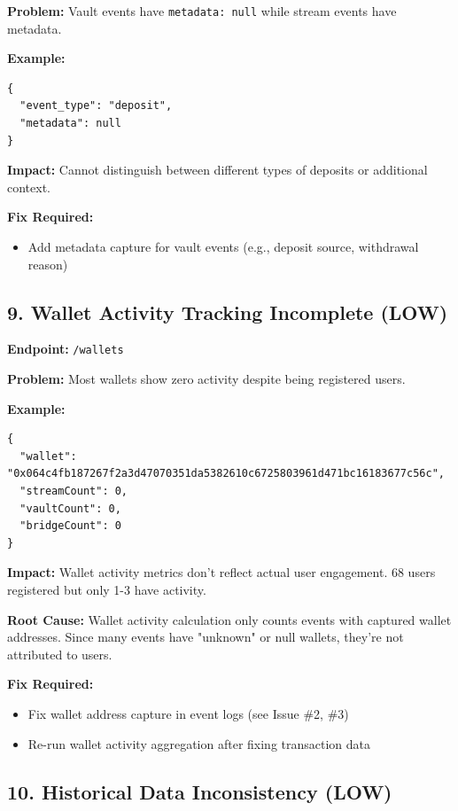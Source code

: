 \documentclass[11pt,a4paper]{article}
\begin{document}
\textbf{Problem:} Vault events have \texttt{metadata: null} while stream events have metadata.

\textbf{Example:}
\begin{lstlisting}
{
  "event_type": "deposit",
  "metadata": null
}
\end{lstlisting}

\textbf{Impact:} Cannot distinguish between different types of deposits or additional context.

\textbf{Fix Required:}
\begin{itemize}
    \item Add metadata capture for vault events (e.g., deposit source, withdrawal reason)
\end{itemize}

\subsection{9. Wallet Activity Tracking Incomplete (LOW)}

\textbf{Endpoint:} \texttt{/wallets}

\textbf{Problem:} Most wallets show zero activity despite being registered users.

\textbf{Example:}
\begin{lstlisting}
{
  "wallet": "0x064c4fb187267f2a3d47070351da5382610c6725803961d471bc16183677c56c",
  "streamCount": 0,
  "vaultCount": 0,
  "bridgeCount": 0
}
\end{lstlisting}

\textbf{Impact:} Wallet activity metrics don't reflect actual user engagement. 68 users registered but only 1-3 have activity.

\textbf{Root Cause:} Wallet activity calculation only counts events with captured wallet addresses. Since many events have "unknown" or null wallets, they're not attributed to users.

\textbf{Fix Required:}
\begin{itemize}
    \item Fix wallet address capture in event logs (see Issue \#2, \#3)
    \item Re-run wallet activity aggregation after fixing transaction data
\end{itemize}

\subsection{10. Historical Data Inconsistency (LOW)}
\end{document}
